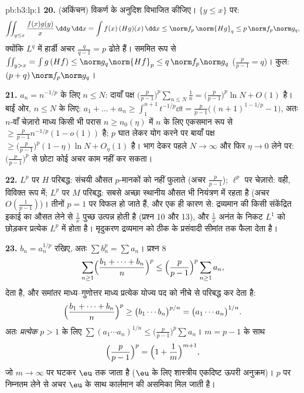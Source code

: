 \begin{solution}{pb:b3:lp:1}
\textbf{20.} (अकिंचन) विकर्ण के अनुदिश विभाजित कीजिए। $\{y \leq
x\}$ पर:
\[
\iint_{y\leq x}\frac{f(x)g(y)}{x}\,\dd y\,\dd x
= \int f(x)\,(Hg)(x)\,\dd x \leq \norm f_p\,\norm{Hg}_q
\leq p\,\norm f_p\norm g_q,
\]
क्योंकि $L^q$ में हार्डी अचर $\frac q{q-1} =
p$ ढोते हैं। सममित रूप से $\iint_{y>x} = \int g\,(Hf) \leq
\norm g_q\norm{Hf}_p \leq q\,\norm f_p\norm g_q$
($\frac
p{p-1} = q$)। कुल: $(p + q)\,\norm f_p\norm g_q$।

\textbf{21.} $a_n = n^{-1/p}$ के लिए $n \leq N$: दायाँ पक्ष $\bigl(\frac p{p-1}\bigr)^p\sum_{n\leq N}\frac1n =
\bigl(\frac p{p-1}\bigr)^p\ln N + O(1)$ है। बाईं ओर, $n
\leq N$
के लिए: $a_1 + \dots + a_n \geq \int_1^{n+1}t^{-1/p}\dd t =
\frac{p}{p-1}\bigl((n+1)^{1-1/p} - 1\bigr)$, अतः $n$-वाँ चेज़ारो माध्य किसी भी परास $n \geq n_0(\eta)$ में
$n$ के लिए एकसमान रूप से $\geq \frac p{p-1}n^{-1/p}(1 -
o(1))$ है; $p$ घात लेकर योग करने पर बायाँ
पक्ष $\geq
\bigl(\frac p{p-1}\bigr)^p(1 - \eta)\ln N + O_\eta(1)$ है। भाग देकर पहले $N \to \infty$ और फिर $\eta \to 0$ लेने पर: $\bigl(\frac p{p-1}\bigr)^p$ से
छोटा कोई अचर काम नहीं कर सकता।

\textbf{22.} $L^p$ पर $H$ परिबद्ध: संचयी औसत $p$-मानकों को नहीं
फुलाते (अचर $\frac p{p-1}$); $\ell^p$ पर चेज़ारो: वही, विविक्त रूप में; $L^p$
पर $M$ परिबद्ध: सबसे अच्छा स्थानीय औसत भी नियंत्रण में रहता है
(अचर $O(\frac1{p-1})$)। तीनों $p = 1$ पर विफल हो जाते हैं, और एक ही कारण से:
द्रव्यमान की किसी संकेंद्रित इकाई का औसत लेने से $\frac1x$ पुच्छ उत्पन्न
होती है (प्रश्न 10 और 13), और $\frac1x$ अनंत के निकट $L^1$ को छोड़कर
प्रत्येक $L^p$ में होता है। मृदुकरण द्रव्यमान को ठीक  के
प्रसंवादी सीमांत तक फैला देता है।

\textbf{23.} $b_n = a_n^{1/p}$ रखिए, अतः $\sum b_n^p = \sum
a_n$। प्रश्न 8
\[
\sum_{n\geq1}\Bigl(\frac{b_1 + \dots + b_n}n\Bigr)^{p}
\leq \Bigl(\frac p{p-1}\Bigr)^{p}\sum_{n\geq1}a_n,
\]
देता है, और समांतर माध्य--गुणोत्तर माध्य प्रत्येक योज्य पद को नीचे
से परिबद्ध कर देता है:
\[
\Bigl(\frac{b_1 + \dots + b_n}n\Bigr)^{p}
\geq \bigl(b_1\cdots b_n\bigr)^{p/n}
= \bigl(a_1\cdots a_n\bigr)^{1/n}.
\]
अतः \emph{प्रत्येक} $p > 1$ के लिए $\sum(a_1\cdots a_n)^{1/n} \leq \bigl(\frac
p{p-1}\bigr)^p\sum a_n$। $m =
p - 1$ के साथ
\[
\Bigl(\frac p{p-1}\Bigr)^{p} =
\Bigl(1 + \frac1m\Bigr)^{m+1},
\]
जो $m \to \infty$ पर घटकर $\eu$ तक जाता है ($\eu$ के लिए शास्त्रीय एकदिष्ट
ऊपरी अनुक्रम)। $p$ पर निम्नतम लेने से अचर $\eu$ के साथ कार्लमान
की असमिका मिल जाती है।


\end{solution}
